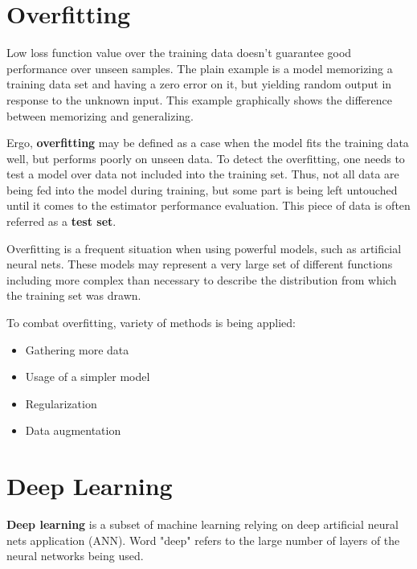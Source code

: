 \documentclass[thesis=B,english]{FITthesis}[2019/12/23]
\begin{document}
\section{Overfitting}

Low loss function value over the training data doesn't guarantee good performance over unseen samples. The plain example is a model memorizing a training data set and having a zero error on it, but yielding random output in response to the unknown input. This example graphically shows the difference between memorizing and generalizing.

Ergo, \textbf{overfitting} may be defined as a case when the model fits the training data well, but performs poorly on unseen data. To detect the overfitting, one needs to test a model over data not included into the training set. Thus, not all data are being fed into the model during training, but some part is being left untouched until it comes to the estimator performance evaluation. This piece of data is often referred as a \textbf{test set}.

Overfitting is a frequent situation when using powerful models, such as artificial neural nets. These models may represent a very large set of different functions including more complex than necessary to describe the distribution from which the training set was drawn.

To combat overfitting, variety of methods is being applied:
\begin{itemize}
	\item Gathering more data
	\item Usage of a simpler model
	\item Regularization
	\item Data augmentation
\end{itemize}

\section{Deep Learning}

\textbf{Deep learning} is a subset of machine learning relying on deep artificial neural nets application (ANN). Word "deep" refers to the large number of layers of the neural networks being used.
\end{document}
